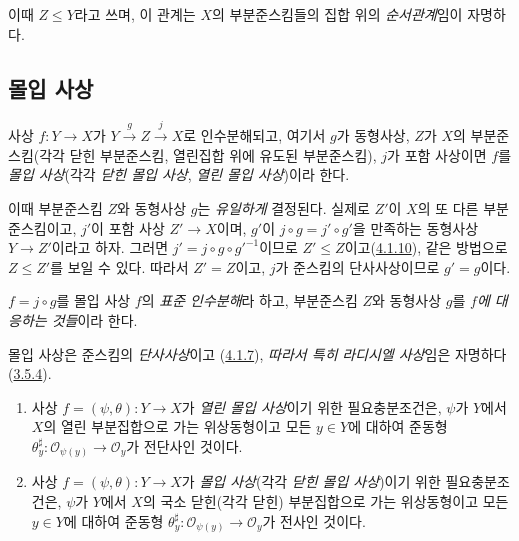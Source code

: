 이때 $Z\leq Y$라고 쓰며, 이 관계는 $X$의 부분준스킴들의 집합 위의
\emph{순서관계}임이 자명하다.

\subsection{몰입 사상}
\label{subsection:I.4.2-ko}

\begin{definition}[4.2.1]
\label{I.4.2.1-ko}
사상 $f:Y\to X$가
$Y\xrightarrow{g}Z\xrightarrow{j}X$로 인수분해되고, 여기서 $g$가
동형사상, $Z$가 $X$의 부분준스킴(각각 닫힌 부분준스킴, 열린집합 위에
유도된 부분준스킴), $j$가 포함 사상이면 $f$를 \emph{몰입 사상}(각각
\emph{닫힌 몰입 사상}, \emph{열린 몰입 사상})이라 한다.
\end{definition}

이때 부분준스킴 $Z$와 동형사상 $g$는 \emph{유일하게} 결정된다. 실제로
$Z'$이 $X$의 또 다른 부분준스킴이고, $j'$이 포함 사상 $Z'\to X$이며,
$g'$이 $j\circ g=j'\circ g'$을 만족하는 동형사상 $Y\to Z'$이라고 하자.
그러면 $j'=j\circ g\circ {g'}^{-1}$이므로
$Z'\leq Z$이고(\hyperref[I.4.1.10-ko]{4.1.10}), 같은 방법으로
$Z\leq Z'$를 보일 수 있다. 따라서 $Z'=Z$이고, $j$가 준스킴의
단사사상이므로 $g'=g$이다.

$f=j\circ g$를 몰입 사상 $f$의 \emph{표준 인수분해}라 하고,
부분준스킴 $Z$와 동형사상 $g$를 \emph{$f$에 대응하는 것들}이라 한다.

몰입 사상은 준스킴의 \emph{단사사상}이고
(\hyperref[I.4.1.7-ko]{4.1.7}), \emph{따라서 특히} \emph{라디시엘 사상}임은
자명하다(\hyperref[I.3.5.4-ko]{3.5.4}).

\begin{proposition}[4.2.2]
\label{I.4.2.2-ko}
\begin{enumerate}
  \item[a)] 사상 $f=(\psi,\theta):Y\to X$가 \emph{열린 몰입 사상}이기
  위한 필요충분조건은, $\psi$가 $Y$에서 $X$의 열린 부분집합으로 가는
  위상동형이고 모든 $y\in Y$에 대하여 준동형
  $\theta_y^\sharp:\mathscr{O}_{\psi(y)}\to\mathscr{O}_y$가
  전단사인 것이다.
  \item[b)] 사상 $f=(\psi,\theta):Y\to X$가 \emph{몰입 사상}(각각
  \emph{닫힌 몰입 사상})이기 위한 필요충분조건은, $\psi$가 $Y$에서
  $X$의 국소 닫힌(각각 닫힌) 부분집합으로 가는 위상동형이고 모든
  $y\in Y$에 대하여 준동형
  $\theta_y^\sharp:\mathscr{O}_{\psi(y)}\to\mathscr{O}_y$가 전사인
  것이다.
\end{enumerate}
\end{proposition}

